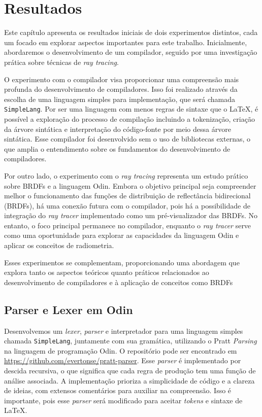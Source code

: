 \chapter{Resultados}
\label{resultadosiniciais}


Este capítulo apresenta os resultados iniciais de dois experimentos distintos, cada um focado em explorar aspectos importantes para este trabalho. Inicialmente, abordaremos o desenvolvimento de um compilador, seguido por uma investigação prática sobre técnicas de \textit{ray tracing}.


O experimento com o compilador visa proporcionar uma compreensão mais profunda  do desenvolvimento de compiladores. Isso foi realizado através da escolha de uma linguagem simples para implementação, que será chamada \texttt{SimpleLang}. Por ser uma linguagem com menos regras de sintaxe que o \LaTeX, é possível a exploração do processo de compilação incluindo a tokenização, criação da árvore sintática e interpretação do código-fonte por meio dessa árvore sintática. Esse compilador foi desenvolvido sem o uso de bibliotecas externas, o que amplia o entendimento sobre os fundamentos do desenvolvimento de compiladores.




Por outro lado, o experimento com o \textit{ray tracing} representa um estudo prático sobre BRDFs e a linguagem Odin. Embora o objetivo principal seja compreender melhor o funcionamento das funções de distribuição de reflectância bidirecional (BRDFs), há uma conexão futura com o compilador, pois há a possibilidade de integração do \textit{ray tracer} implementado como um pré-visualizador das BRDFs. No entanto, o foco principal permanece no compilador, enquanto o \textit{ray tracer} serve como uma oportunidade para explorar as capacidades da linguagem Odin e aplicar os conceitos de radiometria.


Esses experimentos se complementam, proporcionando uma abordagem que explora tanto os aspectos teóricos quanto práticos relacionados ao desenvolvimento de compiladores e à aplicação de conceitos como BRDFs


\section{Parser e Lexer em Odin} \label{parser}


Desenvolvemos um \textit{lexer}, \textit{parser} e interpretador para uma linguagem simples chamada \texttt{SimpleLang}, juntamente com sua gramática, utilizando o Pratt \textit{Parsing} na linguagem de programação Odin. O repositório pode ser encontrado em \url{https://github.com/evertonse/pratt-parser}. Esse \textit{parser} é implementado por descida recursiva, o que significa que cada regra de produção tem uma função de análise associada. A implementação prioriza a simplicidade de código e a clareza de ideias, com extensos comentários para auxiliar na compreensão. Isso é importante, pois esse \textit{parser} será modificado para aceitar \textit{tokens} e sintaxe de \LaTeX.


